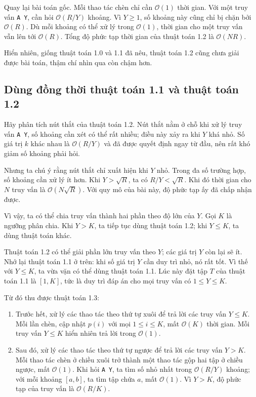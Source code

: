 \documentclass[11pt]{article}
\newcommand{\Oh}{\mathcal{O}}
\begin{document}
Quay lại bài toán gốc. Mỗi thao tác chèn chỉ cần $\Oh(1)$ thời gian. Với một
truy vấn \texttt{A Y}, cần hỏi $\Oh(R/Y)$ khoảng. Vì $Y\ge 1$, số khoảng này
cũng chỉ bị chặn bởi $\Oh(R)$. Dù mỗi khoảng có thể xử lý trong $\Oh(1)$,
thời gian cho một truy vấn vẫn lên tới $\Oh(R)$. Tổng độ phức tạp thời gian
của thuật toán 1.2 là $\Oh(NR)$.

Hiển nhiên, giống thuật toán 1.0 và 1.1 đã nêu, thuật toán 1.2 cũng chưa giải
được bài toán, thậm chí nhìn qua còn chậm hơn.

\subsection{Dùng đồng thời thuật toán 1.1 và thuật toán 1.2}

Hãy phân tích nút thắt của thuật toán 1.2. Nút thắt nằm ở chỗ khi xử lý truy
vấn \texttt{A Y}, số khoảng cần xét có thể rất nhiều; điều này xảy ra khi $Y$
khá nhỏ. Số giá trị $k$ khác nhau là $\Oh(R/Y)$ và đã được quyết định ngay từ
đầu, nên rất khó giảm số khoảng phải hỏi.

Nhưng ta chú ý rằng nút thắt chỉ xuất hiện khi $Y$ nhỏ. Trong đa số trường
hợp, số khoảng cần xử lý ít hơn. Khi $Y>\sqrt{R}$, ta có
$R/Y<\sqrt{R}$. Khi đó thời gian cho $N$ truy vấn là $\Oh(N\sqrt{R})$. Với quy
mô của bài này, độ phức tạp ấy đã chấp nhận được.

Vì vậy, ta có thể chia truy vấn thành hai phần theo độ lớn của $Y$. Gọi $K$ là
ngưỡng phân chia. Khi $Y>K$, ta tiếp tục dùng thuật toán 1.2; khi $Y\le K$,
ta dùng thuật toán khác.

Thuật toán 1.2 có thể giải phần lớn truy vấn theo $Y$; các giá trị $Y$ còn lại
sẽ ít. Nhớ lại thuật toán 1.1 ở trên: khi số giá trị $Y$ cần duy trì nhỏ, nó
rất tốt. Vì thế với $Y\le K$, ta vừa vặn có thể dùng thuật toán 1.1. Lúc này
đặt tập $T$ của thuật toán 1.1 là $[1,K]$, tức là duy trì đáp án cho mọi truy
vấn có $1\le Y\le K$.

Từ đó thu được thuật toán 1.3:
\begin{enumerate}
  \item Trước hết, xử lý các thao tác theo thứ tự xuôi để trả lời các truy vấn
  $Y\le K$. Mỗi lần chèn, cập nhật $p(i)$ với mọi $1\le i\le K$, mất
  $\Oh(K)$ thời gian. Mỗi truy vấn $Y\le K$ hiển nhiên trả lời trong
  $\Oh(1)$.
  \item Sau đó, xử lý các thao tác theo thứ tự ngược để trả lời các truy vấn
  $Y>K$. Mỗi thao tác chèn ở chiều xuôi trở thành một thao tác gộp hai tập ở
  chiều ngược, mất $\Oh(1)$. Khi hỏi \texttt{A Y}, ta tìm số nhỏ nhất trong
  $\Oh(R/Y)$ khoảng; với mỗi khoảng $[a,b]$, ta tìm tập chứa $a$, mất
  $\Oh(1)$. Vì $Y>K$, độ phức tạp của truy vấn là $\Oh(R/K)$.
\end{enumerate}
\end{document}

